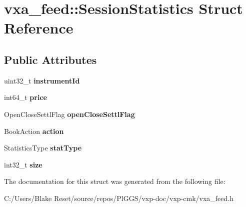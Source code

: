 \hypertarget{structvxa__feed_1_1_session_statistics}{}\section{vxa\+\_\+feed\+::Session\+Statistics Struct Reference}
\label{structvxa__feed_1_1_session_statistics}
\subsection*{Public Attributes}
\begin{DoxyCompactItemize}
\item 
\mbox{\label{structvxa__feed_1_1_session_statistics_a16c0ff9c1213b408b6da392653ecce72}} 
uint32\+\_\+t {\bfseries instrument\+Id}
\item 
\mbox{\label{structvxa__feed_1_1_session_statistics_adf5f9c149d2e1ecf11cfd76d58a61c97}} 
int64\+\_\+t {\bfseries price}
\item 
\mbox{\label{structvxa__feed_1_1_session_statistics_a0c429befca047a2d537d41f000182754}} 
Open\+Close\+Settl\+Flag {\bfseries open\+Close\+Settl\+Flag}
\item 
\mbox{\label{structvxa__feed_1_1_session_statistics_a0e668f224c1d3ecd45a7f52ba204225c}} 
Book\+Action {\bfseries action}
\item 
\mbox{\label{structvxa__feed_1_1_session_statistics_a58f2b78e98548d2c9b5d6df32005f9f8}} 
Statistics\+Type {\bfseries stat\+Type}
\item 
\mbox{\label{structvxa__feed_1_1_session_statistics_ae656ecacd973f25d066001fc568f595a}} 
int32\+\_\+t {\bfseries size}
\end{DoxyCompactItemize}


The documentation for this struct was generated from the following file\+:\begin{DoxyCompactItemize}
\item 
C\+:/\+Users/\+Blake Reset/source/repos/\+Pl\+G\+G\+S/vxp-\/doc/vxp-\/cmk/vxa\+\_\+feed.\+h\end{DoxyCompactItemize}
